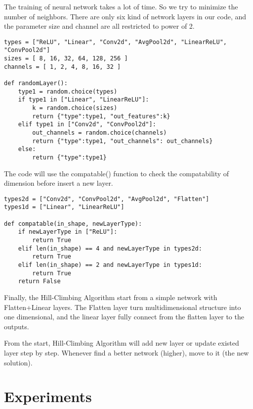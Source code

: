 \documentclass{article}
\begin{document}
The training of neural network takes a lot of time. So we try to minimize the number of neighbors. There are only six kind of network layers in our code, and the parameter size and channel are all restricted to power of 2.

\begin{minipage}{\linewidth}
\begin{lstlisting}
types = ["ReLU", "Linear", "Conv2d", "AvgPool2d", "LinearReLU", "ConvPool2d"]
sizes = [ 8, 16, 32, 64, 128, 256 ]
channels = [ 1, 2, 4, 8, 16, 32 ]

def randomLayer():
    type1 = random.choice(types)
    if type1 in ["Linear", "LinearReLU"]:
        k = random.choice(sizes)
        return {"type":type1, "out_features":k}
    elif type1 in ["Conv2d", "ConvPool2d"]:
        out_channels = random.choice(channels)
        return {"type":type1, "out_channels": out_channels}
    else:                                    
        return {"type":type1}
\end{lstlisting}
\end{minipage}

The code will use the compatable() function to check the compatability of dimension before insert a new layer.

\begin{minipage}{\linewidth}
\begin{lstlisting}
types2d = ["Conv2d", "ConvPool2d", "AvgPool2d", "Flatten"]
types1d = ["Linear", "LinearReLU"]

def compatable(in_shape, newLayerType):
    if newLayerType in ["ReLU"]:
        return True
    elif len(in_shape) == 4 and newLayerType in types2d:
        return True
    elif len(in_shape) == 2 and newLayerType in types1d:
        return True
    return False
\end{lstlisting}
\end{minipage}

Finally, the Hill-Climbing Algorithm start from a simple network with Flatten+Linear layers. The Flatten layer turn multidimensional structure into one dimensional, and the linear layer fully connect from the flatten layer to the outputs. 

From the start, Hill-Climbing Algorithm will add new layer or update existed layer step by step. Whenever find a better network (higher), move to it (the new solution). 


\section{Experiments}
\end{document}
